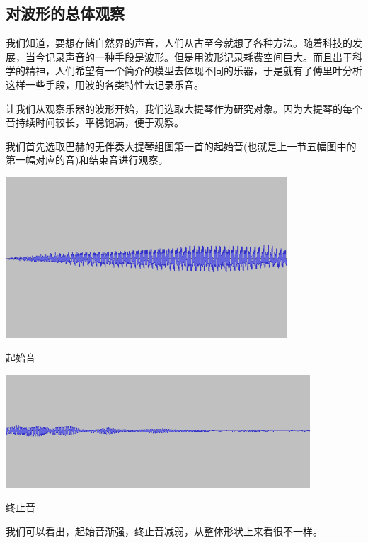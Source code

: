 \subsection{对波形的总体观察}
\par
我们知道，要想存储自然界的声音，人们从古至今就想了各种方法。随着科技的发展，当今记录声音的一种手段是波形。但是用波形记录耗费空间巨大。而且出于科学的精神，人们希望有一个简介的模型去体现不同的乐器，于是就有了傅里叶分析这样一些手段，用波的各类特性去记录乐音。
\par
让我们从观察乐器的波形开始，我们选取大提琴作为研究对象。因为大提琴的每个音持续时间较长，平稳饱满，便于观察。
\par
我们首先选取巴赫的无伴奏大提琴组图第一首的起始音(也就是上一节五幅图中的第一幅对应的音)和结束音进行观察。
\vspace{1cm}
\begin{center}
    \includegraphics[height=6cm]{celloFirst.png}

    起始音
\end{center}
\vspace{1cm}
\begin{center}
    \includegraphics[height=4.2cm]{celloLast.png}

    终止音
\end{center}
\vspace{2cm}
\par
我们可以看出，起始音渐强，终止音减弱，从整体形状上来看很不一样。
